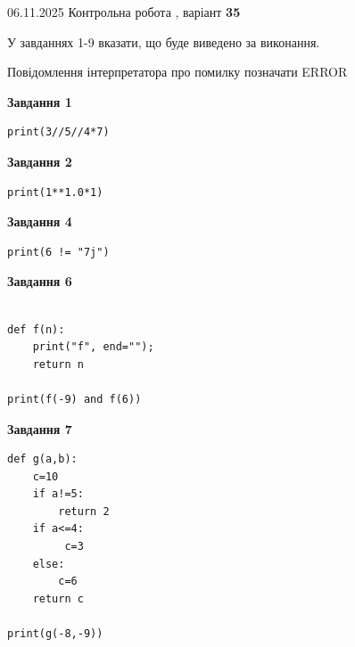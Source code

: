 \documentclass[12pt, ukrainian]{article}
\begin{document}
{\Large{06.11.2025 Контрольна робота , варіант  \No \textbf { 35 }\par}}
{
\begin {large}
У завданнях 1-9 вказати, що буде виведено за виконання.

Повідомлення інтерпретатора про помилку позначати ERROR

\begin{minipage}[t]{7.5cm}

\begin{center}
\textbf{Завдання 1}
\end{center}

\begin{verbatim}
print(3//5//4*7)
\end{verbatim}



\begin{center}
\textbf{Завдання 2}
\end{center}

\begin{verbatim}
print(1**1.0*1)
\end{verbatim}



\begin{center}
\textbf{Завдання 4}
\end{center}

\begin{verbatim}
print(6 != "7j")
\end{verbatim}



\begin{center}
\textbf{Завдання 6}
\end{center}

\begin{verbatim}

def f(n):
    print("f", end="");
    return n

print(f(-9) and f(6))
\end{verbatim}



\begin{center}
\textbf{Завдання 7}
\end{center}

\begin{verbatim}
def g(a,b):
    c=10
    if a!=5:
        return 2
    if a<=4:
         c=3
    else: 
        c=6
    return c

print(g(-8,-9))
\end{verbatim}


\end{minipage}
\end{large}}
\end{document}
